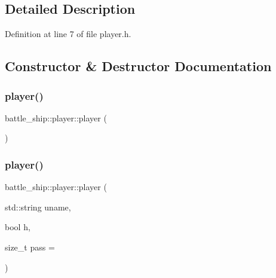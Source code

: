 \subsection{Detailed Description}


Definition at line 7 of file player.\+h.



\subsection{Constructor \& Destructor Documentation}
\mbox{\label{classbattle__ship_1_1player_a54df3c03653a24049b9629ce5c55fafa}} 
\subsubsection{\texorpdfstring{player()}{player()}\hspace{0.1cm}{\footnotesize\ttfamily [1/2]}}
{\footnotesize\ttfamily battle\+\_\+ship\+::player\+::player (\begin{DoxyParamCaption}{ }\end{DoxyParamCaption})\hspace{0.3cm}{\ttfamily [default]}}

\mbox{\label{classbattle__ship_1_1player_a7aeba726c496f2304b8f6b9fb811f94d}} 
\subsubsection{\texorpdfstring{player()}{player()}\hspace{0.1cm}{\footnotesize\ttfamily [2/2]}}
{\footnotesize\ttfamily battle\+\_\+ship\+::player\+::player (\begin{DoxyParamCaption}\item[{std\+::string}]{uname,  }\item[{bool}]{h,  }\item[{size\+\_\+t}]{pass = {} }\end{DoxyParamCaption})\hspace{0.3cm}{\ttfamily [inline]}}



